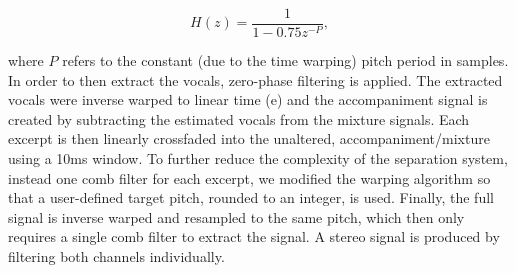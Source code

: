 \begin{equation}
  H(z) = \frac{1}{1 - 0.75z^{-P}},
\end{equation}

where \(P\) refers to the constant (due to the time warping) pitch period in samples.
In order to then extract the vocals, zero-phase filtering is applied.
The extracted vocals were inverse warped to linear time (e) and the accompaniment signal is created by subtracting the estimated vocals from the mixture signals.
Each excerpt is then linearly crossfaded into the unaltered, accompaniment/mixture using a 10ms window.
To further reduce the complexity of the separation system, instead one comb filter for each excerpt, we modified the warping algorithm so that a user-defined target pitch, rounded to an integer, is used.
Finally, the full signal is inverse warped and resampled to the same pitch, which then only requires a single comb filter to extract the signal.
A stereo signal is produced by filtering both channels individually.

